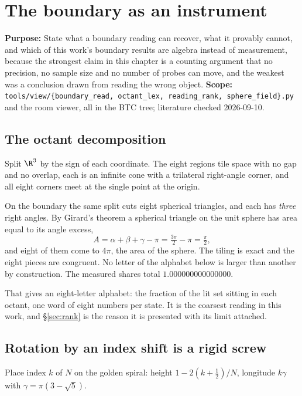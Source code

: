 \chapter{The boundary as an instrument}

\textbf{Purpose:} State what a boundary reading can recover, what it provably cannot, and which of this work's boundary results are algebra instead of measurement, because the strongest claim in this chapter is a counting argument that no precision, no sample size and no number of probes can move, and the weakest was a conclusion drawn from reading the wrong object. \textbf{Scope:} \texttt{tools/\allowbreak{}view/\allowbreak{}\{boundary\_read, octant\_lex, reading\_rank, sphere\_field\}.py} and the room viewer, all in the BTC tree; literature checked 2026-09-10.

\section{The octant decomposition}

Split \(\R^3\) by the sign of each coordinate. The eight regions tile space with no gap and no overlap, each is an infinite cone with a trilateral right-angle corner, and all eight corners meet at the single point at the origin.

On the boundary the same split cuts eight spherical triangles, and each has \emph{three} right angles. By Girard's theorem a spherical triangle on the unit sphere has area equal to its angle excess,
\[
  A = \alpha + \beta + \gamma - \pi = \tfrac{3\pi}{2} - \pi = \tfrac{\pi}{2},
\]
and eight of them come to \(4\pi\), the area of the sphere. The tiling is exact and the eight pieces are congruent. No letter of the alphabet below is larger than another by construction. The measured shares total \(1.000000000000000\).

That gives an eight-letter alphabet: the fraction of the lit set sitting in each octant, one word of eight numbers per state. It is the coarsest reading in this work, and \S\ref{sec:rank} is the reason it is presented with its limit attached.

\section{Rotation by an index shift is a rigid screw}

Place index \(k\) of \(N\) on the golden spiral: height \(1 - 2(k + \tfrac12)/N\), longitude \(k\gamma\) with \(\gamma = \pi(3 - \sqrt5)\).

